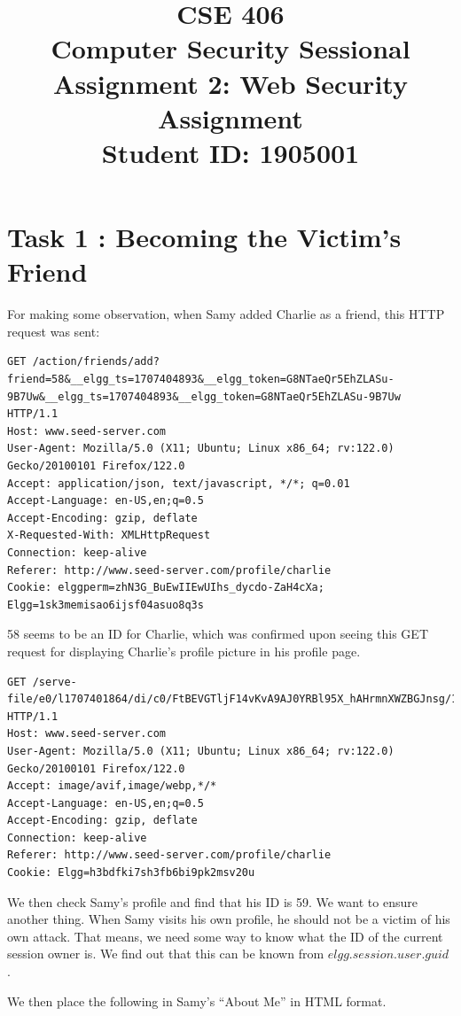 \documentclass[12pt]{article}
\title{CSE 406 \\
Computer Security Sessional \\
\vspace{10mm}
Assignment 2: Web Security Assignment \\
\vspace{20mm}
Student ID: 1905001 \\
\vspace{15mm}
\RaggedRight
}
\author{}
\date{}
\begin{document}
\maketitle
\newpage

\section*{Task 1 : Becoming the Victim’s Friend}
For making some observation, when Samy added Charlie as a friend, this HTTP request was sent:

\begin{verbatim}
GET /action/friends/add?friend=58&__elgg_ts=1707404893&__elgg_token=G8NTaeQr5EhZLASu-9B7Uw&__elgg_ts=1707404893&__elgg_token=G8NTaeQr5EhZLASu-9B7Uw HTTP/1.1
Host: www.seed-server.com
User-Agent: Mozilla/5.0 (X11; Ubuntu; Linux x86_64; rv:122.0) Gecko/20100101 Firefox/122.0
Accept: application/json, text/javascript, */*; q=0.01
Accept-Language: en-US,en;q=0.5
Accept-Encoding: gzip, deflate
X-Requested-With: XMLHttpRequest
Connection: keep-alive
Referer: http://www.seed-server.com/profile/charlie
Cookie: elggperm=zhN3G_BuEwIIEwUIhs_dycdo-ZaH4cXa; Elgg=1sk3memisao6ijsf04asuo8q3s
\end{verbatim}

58 seems to be an ID for Charlie, which was confirmed upon seeing this GET request for displaying Charlie's profile picture in his profile page.

\begin{verbatim}
GET /serve-file/e0/l1707401864/di/c0/FtBEVGTljF14vKvA9AJ0YRBl95X_hAHrmnXWZBGJnsg/1/58/profile/58large.jpg HTTP/1.1
Host: www.seed-server.com
User-Agent: Mozilla/5.0 (X11; Ubuntu; Linux x86_64; rv:122.0) Gecko/20100101 Firefox/122.0
Accept: image/avif,image/webp,*/*
Accept-Language: en-US,en;q=0.5
Accept-Encoding: gzip, deflate
Connection: keep-alive
Referer: http://www.seed-server.com/profile/charlie
Cookie: Elgg=h3bdfki7sh3fb6bi9pk2msv20u
\end{verbatim}

We then check Samy's profile and find that his ID is 59. We want to ensure another thing. When Samy visits his own profile, he should not be a victim of his own attack. That means, we need some way to know what the ID of the current session owner is. We find out that this can be known from $elgg.session.user.guid$ .

We then place the following in Samy's ``About Me'' in HTML format.
\end{document}
